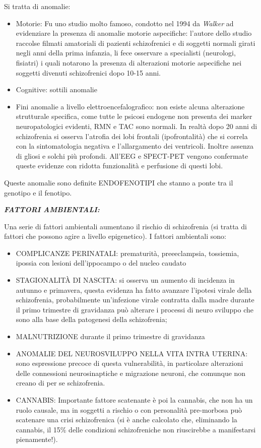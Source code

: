 \documentclass[]{article}
\begin{document}
Si tratta di anomalie:

\begin{itemize}
\item
  Motorie: Fu uno studio molto famoso, condotto nel 1994 da
  \emph{Walker} ad evidenziare la presenza di anomalie motorie
  aspecifiche: l'autore dello studio raccolse filmati amatoriali di
  pazienti schizofrenici e di soggetti normali girati negli anni della
  prima infanzia, li fece osservare a specialisti (neurologi, fisiatri)
  i quali notarono la presenza di alterazioni motorie aspecifiche nei
  soggetti divenuti schizofrenici dopo 10-15 anni.
\item
  Cognitive: sottili anomalie
\item
  Fini anomalie a livello elettroencefalografico: non esiste alcuna
  alterazione strutturale specifica, come tutte le psicosi endogene non
  presenta dei marker neuropatologici evidenti, RMN e TAC sono normali.
  In realtà dopo 20 anni di schizofrenia si osserva l'atrofia dei lobi
  frontali (ipofrontalità) che si correla con la sintomatologia negativa
  e l'allargamento dei ventricoli. Inoltre assenza di gliosi e solchi
  più profondi. All'EEG e SPECT-PET vengono confermate queste evidenze
  con ridotta funzionalità e perfusione di questi lobi.
\end{itemize}

Queste anomalie sono definite ENDOFENOTIPI che stanno a ponte tra il
genotipo e il fenotipo.

\textbf{\emph{FATTORI AMBIENTALI:}}

Una serie di fattori ambientali aumentano il rischio di schizofrenia (si
tratta di fattori che possono agire a livello epigenetico). I fattori
ambientali sono:

\begin{itemize}
\item
  COMPLICANZE PERINATALI: prematurità, preeeclampsia, tossiemia, ipossia
  con lesioni dell'ippocampo o del nucleo caudato
\item
  STAGIONALITÀ DI NASCITA: si osserva un aumento di incidenza in autunno
  e primavera, questa evidenza ha fatto avanzare l'ipotesi virale della
  schizofrenia, probabilmente un'infezione virale contratta dalla madre
  durante il primo trimestre di gravidanza può alterare i processi di
  neuro sviluppo che sono alla base della patogenesi della schizofrenia;
\item
  MALNUTRIZIONE durante il primo trimestre di gravidanza
\item
  ANOMALIE DEL NEUROSVILUPPO NELLA VITA INTRA UTERINA: sono espressione
  precoce di questa vulnerabilità, in particolare alterazioni delle
  connessioni neurosinaptiche e migrazione neuroni, che comunque non
  creano di per se schizofrenia.
\item
  CANNABIS: Importante fattore scatenante è poi la cannabis, che non ha
  un ruolo causale, ma in soggetti a rischio o con personalità
  pre-morbosa può scatenare una crisi schizofrenica (si è anche
  calcolato che, eliminando la cannabis, il 15\% delle condizioni
  schizofreniche non riuscirebbe a manifestarsi pienamente!).
\end{itemize}
\end{document}
